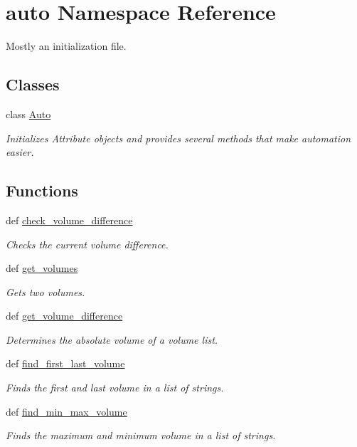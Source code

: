 \hypertarget{namespaceauto}{\section{auto Namespace Reference}
\label{namespaceauto}
}


Mostly an initialization file.  


\subsection*{Classes}
\begin{DoxyCompactItemize}
\item 
class \hyperlink{classauto_1_1_auto}{Auto}
\begin{DoxyCompactList}\small\item\em Initializes Attribute objects and provides several methods that make automation easier. \end{DoxyCompactList}\end{DoxyCompactItemize}
\subsection*{Functions}
\begin{DoxyCompactItemize}
\item 
def \hyperlink{namespaceauto_a53915090ec037344b60988bfa6fbe36b}{check\-\_\-volume\-\_\-difference}
\begin{DoxyCompactList}\small\item\em Checks the current volume difference. \end{DoxyCompactList}\item 
def \hyperlink{namespaceauto_a2bd6aa728264fc3b4ce4599bd4c0dd99}{get\-\_\-volumes}
\begin{DoxyCompactList}\small\item\em Gets two volumes. \end{DoxyCompactList}\item 
def \hyperlink{namespaceauto_a22c2b861da246cc96b2092c5ddb2a267}{get\-\_\-volume\-\_\-difference}
\begin{DoxyCompactList}\small\item\em Determines the absolute volume of a volume list. \end{DoxyCompactList}\item 
def \hyperlink{namespaceauto_a54eadb35ea17c33902b8ccce7fcfb203}{find\-\_\-first\-\_\-last\-\_\-volume}
\begin{DoxyCompactList}\small\item\em Finds the first and last volume in a list of strings. \end{DoxyCompactList}\item 
def \hyperlink{namespaceauto_a27348316feee628368d1407f6f54a94d}{find\-\_\-min\-\_\-max\-\_\-volume}
\begin{DoxyCompactList}\small\item\em Finds the maximum and minimum volume in a list of strings. \end{DoxyCompactList}\end{DoxyCompactItemize}


